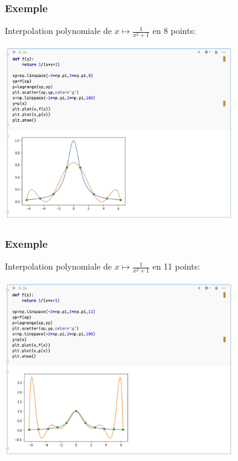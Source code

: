\documentclass{beamer}
\begin{document}
 \begin{frame}
 \frametitle{Exemple}
 Interpolation polynomiale de $x\mapsto \frac 1{x^2+1}$ en 8  points:
\begin{center}
\includegraphics[width=10cm]{images/interpolationDeLagrange04.png}
\end{center}

\end{frame}

 \begin{frame}
 \frametitle{Exemple}
 Interpolation polynomiale de $x\mapsto \frac 1{x^2+1}$ en  11 points:
\begin{center}
\includegraphics[width=10cm]{images/interpolationDeLagrange05.png}
\end{center}

\end{frame}
\end{document}
